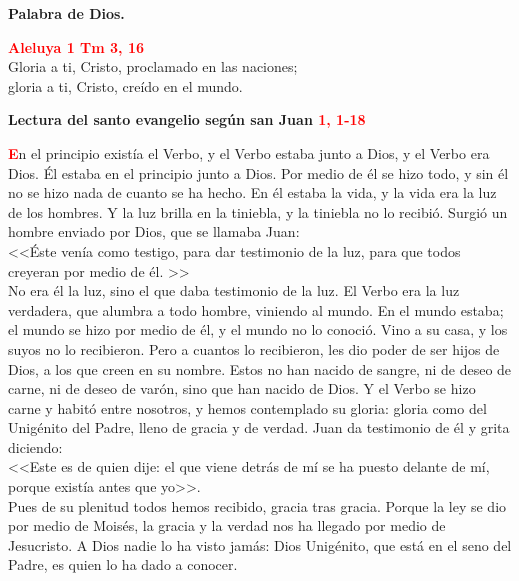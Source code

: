 \documentclass[12pt, letterpaper]{report}
\begin{document}
  {\bfseries Palabra de Dios.}

  \begin{center}
    \Large {\bfseries \textcolor{red}{Aleluya \hspace{1cm} 1 Tm 3, 16}} \\
    Gloria a ti, Cristo, proclamado en las naciones; \\
    gloria a ti, Cristo, cre\'ido en el mundo.
  \end{center}

  \clearpage

  \Huge \textcolor{red}{} \Large {\bfseries Lectura del santo evangelio seg\'un san Juan \hspace{1cm} \textcolor{red}{1, 1-18}}

  \lettrine[lines=2]{\bfseries \textcolor{red}{E}}{}\Large n el principio exist\'ia el Verbo, y el Verbo estaba junto a Dios, y el Verbo era Dios. \'El estaba en el principio junto a Dios. Por medio de \'el se hizo todo, y sin \'el no se hizo nada de cuanto se ha hecho. En \'el estaba la vida, y la vida era la luz de los hombres. Y la luz brilla en la tiniebla, y la tiniebla no lo recibi\'o. Surgi\'o un hombre enviado por Dios, que se llamaba Juan: \\ 
  <<\'Este ven\'ia como testigo, para dar testimonio de la luz, para que todos creyeran por medio de \'el. >> \\
  No era \'el la luz, sino el que daba testimonio de la luz. El Verbo era la luz verdadera, que alumbra a todo hombre, viniendo al mundo. En el mundo estaba; el mundo se hizo por medio de \'el, y el mundo no lo conoci\'o. Vino a su casa, y los suyos no lo recibieron. Pero a cuantos lo recibieron, les dio poder de ser hijos de Dios, a los que creen en su nombre. Estos no han nacido de sangre, ni de deseo de carne, ni de deseo de var\'on, sino que han nacido de Dios. Y el Verbo se hizo carne y habit\'o entre nosotros, y hemos contemplado su gloria: gloria como del Unig\'enito del Padre, lleno de gracia y de verdad. Juan da testimonio de \'el y grita diciendo: \\
  <<Este es de quien dije: el que viene detr\'as de m\'i se ha puesto delante de m\'i, porque exist\'ia antes que yo>>. \\
  Pues de su plenitud todos hemos recibido, gracia tras gracia. Porque la ley se dio por medio de Mois\'es, la gracia y la verdad nos ha llegado por medio de Jesucristo. A Dios nadie lo ha visto jam\'as: Dios Unig\'enito, que est\'a en el seno del Padre, es quien lo ha dado a conocer.
\end{document}
